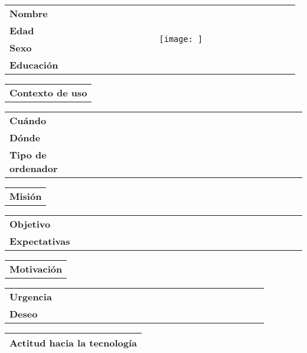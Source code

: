 \documentclass[11pt]{article}
\begin{document}
\begin{table}[H]
  \centering
  \begin{tabular}{p{0.2\linewidth}|p{0.3\linewidth}p{0.475\linewidth}}
    \toprule
    \textbf{Nombre} &  &\multirow{4}{*}{\begin{minipage}{1.\textwidth}\texttt{[image: ]}\end{minipage}}\\
    \textbf{Edad} &  & \\
    \textbf{Sexo} &  & \\
    \textbf{Educación} &  & \\
    \bottomrule
  \end{tabular}

  \begin{tabular}{l}
    \textbf{Contexto de uso} 
\end{tabular}

\begin{tabular}{p{0.2\linewidth}|p{0.8\linewidth}}
  \toprule
  \textbf{Cuándo} & \\
  \textbf{Dónde}  & \\
  \textbf{Tipo de ordenador} & \\
  \bottomrule
\end{tabular}

\begin{tabular}{l}
  \textbf{Misión} 
\end{tabular}

\begin{tabular}{p{0.2\linewidth}|p{0.8\linewidth}}
  \toprule
  \textbf{Objetivo} & \\
  \textbf{Expectativas}  &  \\
  \bottomrule
\end{tabular}

\begin{tabular}{l}
  \textbf{Motivación} 
\end{tabular}

\begin{tabular}{p{0.2\linewidth}|p{0.8\linewidth}}
  \toprule
  \textbf{Urgencia} & \\
  \textbf{Deseo}  & \\
  \bottomrule
\end{tabular}

\begin{tabular}{p{1.028\linewidth}}
  \textbf{Actitud hacia la tecnología}\\
  \midrule
\end{tabular}
\end{table}
\end{document}
